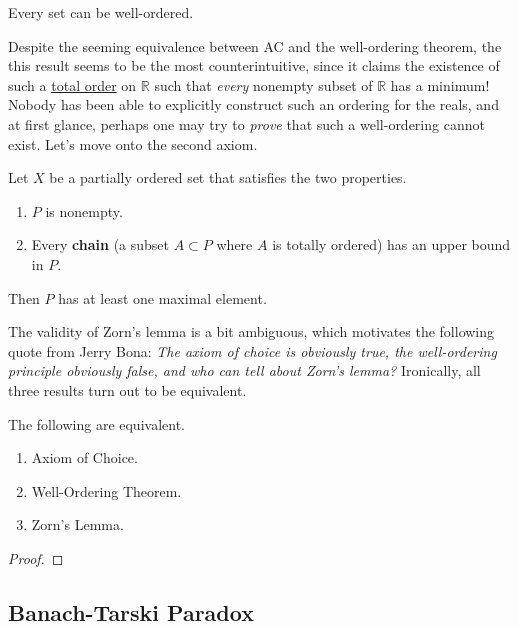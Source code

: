   \begin{axiom}
    \label{thm:well-ordering-theorem}
    Every set can be well-ordered. 
  \end{axiom}

  Despite the seeming equivalence between AC and the well-ordering theorem, the this result seems to be the most counterintuitive, since it claims the existence of such a \hyperref[def:total-order]{total order} on $\mathbb{R}$ such that \textit{every} nonempty subset of $\mathbb{R}$ has a minimum! Nobody has been able to explicitly construct such an ordering for the reals, and at first glance, perhaps one may try to \textit{prove} that such a well-ordering cannot exist. Let's move onto the second axiom. 

  \begin{axiom}
    \label{thm:zorns-lemma}
    Let $X$ be a partially ordered set that satisfies the two properties. 
    \begin{enumerate}
      \item $P$ is nonempty. 
      \item Every \textbf{chain} (a subset $A \subset P$ where $A$ is totally ordered) has an upper bound in $P$. 
    \end{enumerate}
    Then $P$ has at least one maximal element. 
  \end{axiom} 

  The validity of Zorn's lemma is a bit ambiguous, which motivates the following quote from Jerry Bona: \textit{The axiom of choice is obviously true, the well-ordering principle obviously false, and who can tell about Zorn's lemma?} Ironically, all three results turn out to be equivalent. 

  \begin{theorem}[Equivalence]
    \label{thm:equivalence}
    The following are equivalent. 
    \begin{enumerate}
      \item Axiom of Choice. 
      \item Well-Ordering Theorem. 
      \item Zorn's Lemma. 
    \end{enumerate}
  \end{theorem}
  \begin{proof}
    
  \end{proof}
 
\subsection{Banach-Tarski Paradox}

